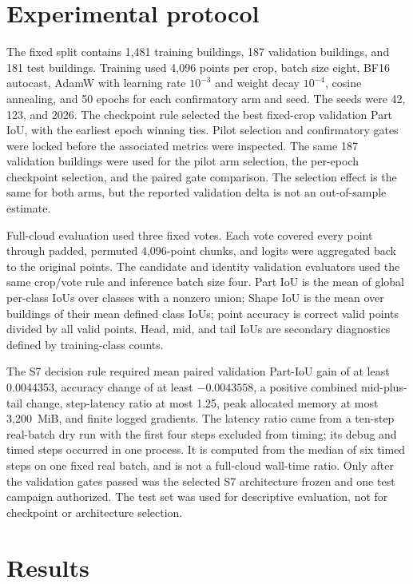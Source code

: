 \documentclass[11pt,a4paper]{article}
\begin{document}
\section{Experimental protocol}

The fixed split contains 1,481 training buildings, 187 validation buildings, and 181 test buildings. Training used 4,096 points per crop, batch size eight, BF16 autocast, AdamW with learning rate $10^{-3}$ and weight decay $10^{-4}$, cosine annealing, and 50 epochs for each confirmatory arm and seed. The seeds were 42, 123, and 2026. The checkpoint rule selected the best fixed-crop validation Part IoU, with the earliest epoch winning ties. Pilot selection and confirmatory gates were locked before the associated metrics were inspected. The same 187 validation buildings were used for the pilot arm selection, the per-epoch checkpoint selection, and the paired gate comparison. The selection effect is the same for both arms, but the reported validation delta is not an out-of-sample estimate.

Full-cloud evaluation used three fixed votes. Each vote covered every point through padded, permuted 4,096-point chunks, and logits were aggregated back to the original points. The candidate and identity validation evaluators used the same crop/vote rule and inference batch size four. Part IoU is the mean of global per-class IoUs over classes with a nonzero union; Shape IoU is the mean over buildings of their mean defined class IoUs; point accuracy is correct valid points divided by all valid points. Head, mid, and tail IoUs are secondary diagnostics defined by training-class counts.

The S7 decision rule required mean paired validation Part-IoU gain of at least 0.0044353, accuracy change of at least $-0.0043558$, a positive combined mid-plus-tail change, step-latency ratio at most 1.25, peak allocated memory at most 3,200~MiB, and finite logged gradients. The latency ratio came from a ten-step real-batch dry run with the first four steps excluded from timing; its debug and timed steps occurred in one process. It is computed from the median of six timed steps on one fixed real batch, and is not a full-cloud wall-time ratio. Only after the validation gates passed was the selected S7 architecture frozen and one test campaign authorized. The test set was used for descriptive evaluation, not for checkpoint or architecture selection.

\section{Results}
\end{document}
